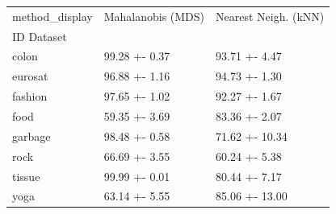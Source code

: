 \begin{tabular}{lll}
\toprule
method_display & Mahalanobis (MDS) & Nearest Neigh. (kNN) \\
ID Dataset &  &  \\
\midrule
colon & 99.28 +- 0.37 & 93.71 +- 4.47 \\
eurosat & 96.88 +- 1.16 & 94.73 +- 1.30 \\
fashion & 97.65 +- 1.02 & 92.27 +- 1.67 \\
food & 59.35 +- 3.69 & 83.36 +- 2.07 \\
garbage & 98.48 +- 0.58 & 71.62 +- 10.34 \\
rock & 66.69 +- 3.55 & 60.24 +- 5.38 \\
tissue & 99.99 +- 0.01 & 80.44 +- 7.17 \\
yoga & 63.14 +- 5.55 & 85.06 +- 13.00 \\
\bottomrule
\end{tabular}
